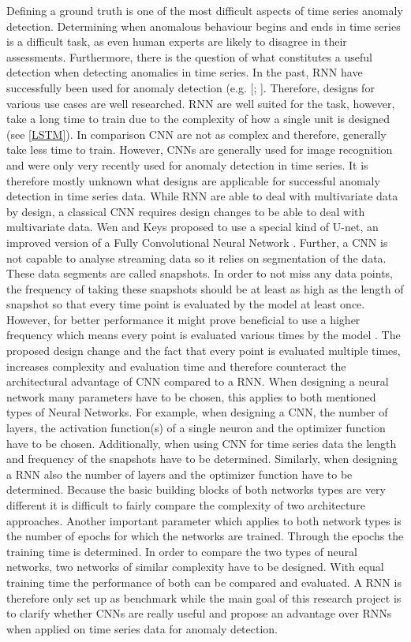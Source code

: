 Defining a ground truth is one of the most difficult aspects of time series anomaly detection. Determining when anomalous behaviour begins and ends in time series is a difficult task, as even human experts are likely to disagree in their assessments. Furthermore, there is the question of what constitutes a useful detection when detecting anomalies in time series.
In the past, RNN have successfully been used for anomaly detection (e.g. [\parencite{Malhotra2015}; \parencite{Fan2016}]. Therefore, designs for various use cases are well researched. RNN are well suited for the task, however, take a long time to train due to the complexity of how a single unit is designed (see \ref{LSTM}). In comparison CNN are not as complex and therefore, generally take less time to train. However, CNNs are generally used for image recognition and were only very recently used for anomaly detection in time series. It is therefore mostly unknown what designs are applicable for successful anomaly detection in time series data. %
While RNN are able to deal with multivariate data by design, a classical CNN requires design changes to be able to deal with multivariate data. Wen and Keys \parencite*{Wen2019} proposed to use a special kind of U-net, an improved version of a Fully Convolutional Neural Network \parencite{Ronneberger2015}.
Further, a CNN is not capable to analyse streaming data so it relies on segmentation of the data. These data segments are called snapshots. In order to not miss any data points, the frequency of taking these snapshots should be at least as high as the length of snapshot so that every time point is evaluated by the model at least once. However, for better performance it might prove beneficial to use a higher frequency which means every point is evaluated various times by the model \parencite{Wen2019}. The proposed design change and the fact that every point is evaluated multiple times, increases complexity and evaluation time and therefore counteract the architectural advantage of CNN compared to a RNN. 
When designing a neural network many parameters have to be chosen, this applies to both mentioned types of Neural Networks. For example, when designing a CNN, the number of layers, the activation function(s) of a single neuron and the optimizer function have to be chosen. Additionally, when using CNN for time series data the length and frequency of the snapshots have to be determined. Similarly, when designing a RNN also the number of layers and the optimizer function have to be determined. Because the basic building blocks of both networks types are very different it is difficult to fairly compare the complexity of two architecture approaches. Another important parameter which applies to both network types is the number of epochs for which the networks are trained. Through the epochs the training time is determined. In order to compare the two types of neural networks, two networks of similar complexity have to be designed. With equal training time the performance of both can be compared and evaluated. A RNN is therefore only set up as benchmark while the main goal of this research project is to clarify whether CNNs are really useful and propose an advantage over RNNs when applied on time series data for anomaly detection.

